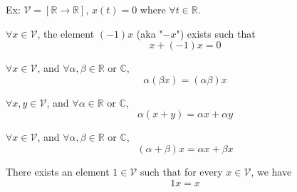\documentclass{article}
\begin{document}
Ex: $\mathcal{V} = [\mathbb{R} \to \mathbb{R} ]$, $x(t) = 0$ where $\forall t \in \mathbb{R}$.


\begin{definition}
  $\forall x \in \mathcal{V}$, the element $(-1) x$ (aka "$-x$") exists such that $$x + (-1)x = 0$$
\end{definition}

\begin{definition}
  $\forall x \in \mathcal{V}$, and $\forall \alpha, \beta \in \mathbb{R}$ or $\mathbb{C}$,
  $$ \alpha (\beta x) = (\alpha \beta) x $$
\end{definition}

\begin{definition}
  $\forall x, y \in \mathcal{V}$, and $\forall \alpha \in \mathbb{R}$ or $\mathbb{C}$,
  $$ \alpha (x + y) = \alpha x + \alpha y $$
\end{definition}

\begin{definition}
  $\forall x \in \mathcal{V}$, and $\forall \alpha, \beta \in \mathbb{R}$ or $\mathbb{C}$,
  $$ (\alpha + \beta) x = \alpha x + \beta x $$
\end{definition}

\begin{definition}
  There exists an element $1 \in \mathcal{V}$ such that for every $x \in \mathcal{V}$, we have $$1 x = x$$
\end{definition}
\end{document}
